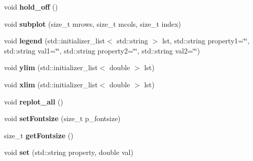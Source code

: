 \begin{DoxyCompactItemize}
\item 
\hypertarget{classkeycpp_1_1_figure_ae5e5ac67e9450ea4fbf06fb3fcc6523a}{void {\bfseries hold\-\_\-off} ()}\label{classkeycpp_1_1_figure_ae5e5ac67e9450ea4fbf06fb3fcc6523a}

\item 
\hypertarget{classkeycpp_1_1_figure_a6d7d8120a0301c002bf40b46fd8b560d}{void {\bfseries subplot} (size\-\_\-t mrows, size\-\_\-t mcols, size\-\_\-t index)}\label{classkeycpp_1_1_figure_a6d7d8120a0301c002bf40b46fd8b560d}

\item 
\hypertarget{classkeycpp_1_1_figure_a2b5a0aae355a33024d2f6c51a8754786}{void {\bfseries legend} (std\-::initializer\-\_\-list$<$ std\-::string $>$ lst, std\-::string property1=\char`\"{}\char`\"{}, std\-::string val1=\char`\"{}\char`\"{}, std\-::string property2=\char`\"{}\char`\"{}, std\-::string val2=\char`\"{}\char`\"{})}\label{classkeycpp_1_1_figure_a2b5a0aae355a33024d2f6c51a8754786}

\item 
\hypertarget{classkeycpp_1_1_figure_aa01c44e6509c7075f4f547531c39741b}{void {\bfseries ylim} (std\-::initializer\-\_\-list$<$ double $>$ lst)}\label{classkeycpp_1_1_figure_aa01c44e6509c7075f4f547531c39741b}

\item 
\hypertarget{classkeycpp_1_1_figure_ae779c53eebbee42148324bd8adfd7d01}{void {\bfseries xlim} (std\-::initializer\-\_\-list$<$ double $>$ lst)}\label{classkeycpp_1_1_figure_ae779c53eebbee42148324bd8adfd7d01}

\item 
\hypertarget{classkeycpp_1_1_figure_a47cae082612e5436a6b0bc3d7f27e9d9}{void {\bfseries replot\-\_\-all} ()}\label{classkeycpp_1_1_figure_a47cae082612e5436a6b0bc3d7f27e9d9}

\item 
\hypertarget{classkeycpp_1_1_figure_a38aea1e2c4cd849622e57ed346ec52f5}{void {\bfseries set\-Fontsize} (size\-\_\-t p\-\_\-fontsize)}\label{classkeycpp_1_1_figure_a38aea1e2c4cd849622e57ed346ec52f5}

\item 
\hypertarget{classkeycpp_1_1_figure_af808550cb627ddbd37fad174cfed2bef}{size\-\_\-t {\bfseries get\-Fontsize} ()}\label{classkeycpp_1_1_figure_af808550cb627ddbd37fad174cfed2bef}

\item 
\hypertarget{classkeycpp_1_1_figure_a7375fe8611759fda180d626f91eab510}{void {\bfseries set} (std\-::string property, double val)}\label{classkeycpp_1_1_figure_a7375fe8611759fda180d626f91eab510}


\end{DoxyCompactItemize}
